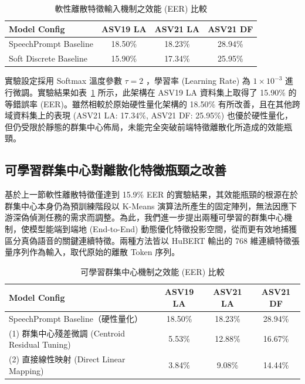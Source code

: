 \begin{table}[H]
\centering
\caption{軟性離散特徵輸入機制之效能 (EER) 比較}
\label{tab:exp2_soft_discrete}
\begin{tabular}{lccc}
\toprule
\textbf{Model Config} & \textbf{ASV19 LA} & \textbf{ASV21 LA} & \textbf{ASV21 DF} \\
\midrule
SpeechPrompt Baseline & 18.50\% & 18.23\% & 28.94\% \\
Soft Discrete Baseline & 15.90\% & 17.34\% & 25.95\% \\
\bottomrule
\end{tabular}
\end{table}

實驗設定採用 Softmax 溫度參數 $\tau = 2$ ，學習率 (Learning Rate) 為 $1\times 10^{-3}$ 進行微調。實驗結果如表~\ref{tab:exp2_soft_discrete} 所示，此架構在 ASV19 LA 資料集上取得了 15.90\% 的等錯誤率 (EER)。雖然相較於原始硬性量化架構的 18.50\% 有所改善，且在其他跨域資料集上的表現 (ASV21 LA: 17.34\%, ASV21 DF: 25.95\%) 也優於硬性量化，但仍受限於靜態的群集中心佈局，未能完全突破前端特徵離散化所造成的效能瓶頸。

\subsection{可學習群集中心對離散化特徵瓶頸之改善}
\label{subsec:learnable_centroids}
基於上一節軟性離散特徵僅達到 15.9\% EER 的實驗結果，其效能瓶頸的根源在於群集中心本身仍為預訓練階段以 K-Means 演算法所產生的固定陣列，無法因應下游深偽偵測任務的需求而調整。為此，我們進一步提出兩種可學習的群集中心機制，使模型能端到端地 (End-to-End) 動態優化特徵投影空間，從而更有效地捕獲區分真偽語音的關鍵連續特徵。兩種方法皆以 HuBERT 輸出的 768 維連續特徵張量序列作為輸入，取代原始的離散 Token 序列。

\begin{table}[H]
\centering
\caption{可學習群集中心機制之效能 (EER) 比較}
\label{tab:exp3_learnable_centroids}
\begin{tabular}{lccc}
\toprule
\textbf{Model Config} & \textbf{ASV19 LA} & \textbf{ASV21 LA} & \textbf{ASV21 DF} \\
\midrule
SpeechPrompt Baseline（硬性量化） & 18.50\% & 18.23\% & 28.94\% \\
\midrule
(1) 群集中心殘差微調 (Centroid Residual Tuning) & 5.53\% & 12.88\% & 16.67\% \\
(2) 直接線性映射 (Direct Linear Mapping) & 3.84\% & 9.08\% & 14.44\% \\
\bottomrule
\end{tabular}
\end{table}


